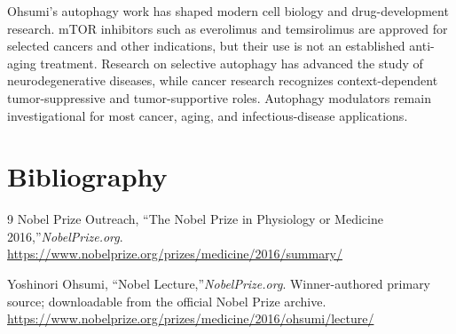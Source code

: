 Ohsumi's autophagy work has shaped modern cell biology and drug-development research. mTOR inhibitors such as everolimus and temsirolimus are approved for selected cancers and other indications, but their use is not an established anti-aging treatment. Research on selective autophagy has advanced the study of neurodegenerative diseases, while cancer research recognizes context-dependent tumor-suppressive and tumor-supportive roles. Autophagy modulators remain investigational for most cancer, aging, and infectious-disease applications.


\section{Bibliography}

\begin{thebibliography}{9}
Nobel Prize Outreach, ``The Nobel Prize in Physiology or Medicine 2016,''\emph{NobelPrize.org}.\\
\url{https://www.nobelprize.org/prizes/medicine/2016/summary/}

Yoshinori Ohsumi, ``Nobel Lecture,''\emph{NobelPrize.org}. Winner-authored primary source; downloadable from the official Nobel Prize archive.\\
\url{https://www.nobelprize.org/prizes/medicine/2016/ohsumi/lecture/}
\end{thebibliography}
